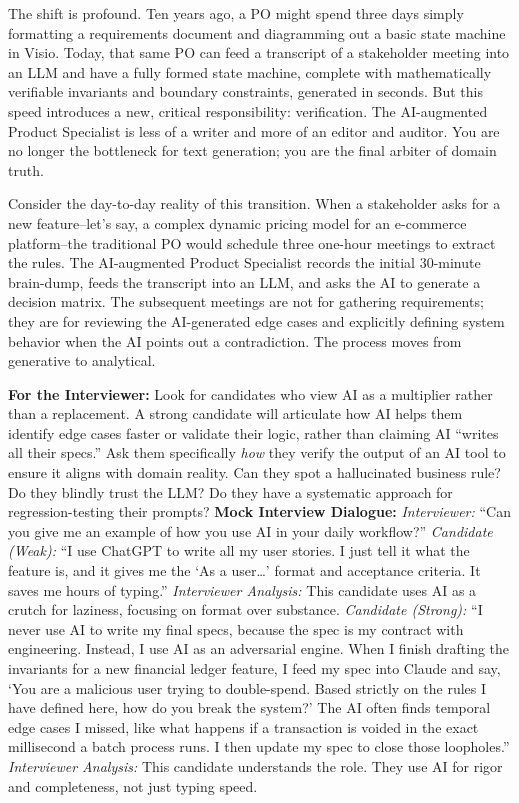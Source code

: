 \documentclass[
  11pt,
  openany,
  oneside]{book}
\renewenvironment{quote}{\begin{customquote}}{\end{customquote}}
\begin{document}
The shift is profound. Ten years ago, a PO might spend three days simply
formatting a requirements document and diagramming out a basic state
machine in Visio. Today, that same PO can feed a transcript of a
stakeholder meeting into an LLM and have a fully formed state machine,
complete with mathematically verifiable invariants and boundary
constraints, generated in seconds. But this speed introduces a new,
critical responsibility: verification. The AI-augmented Product
Specialist is less of a writer and more of an editor and auditor. You
are no longer the bottleneck for text generation; you are the final
arbiter of domain truth.

Consider the day-to-day reality of this transition. When a stakeholder
asks for a new feature--let's say, a complex dynamic pricing model for
an e-commerce platform--the traditional PO would schedule three one-hour
meetings to extract the rules. The AI-augmented Product Specialist
records the initial 30-minute brain-dump, feeds the transcript into an
LLM, and asks the AI to generate a decision matrix. The subsequent
meetings are not for gathering requirements; they are for reviewing the
AI-generated edge cases and explicitly defining system behavior when the
AI points out a contradiction. The process moves from generative to
analytical.

\begin{quote}
\textbf{For the Interviewer:} Look for candidates who view AI as a
multiplier rather than a replacement. A strong candidate will articulate
how AI helps them identify edge cases faster or validate their logic,
rather than claiming AI ``writes all their specs.'' Ask them
specifically \emph{how} they verify the output of an AI tool to ensure
it aligns with domain reality. Can they spot a hallucinated business
rule? Do they blindly trust the LLM? Do they have a systematic approach
for regression-testing their prompts? \textbf{Mock Interview Dialogue:}
\emph{Interviewer:} ``Can you give me an example of how you use AI in
your daily workflow?'' \emph{Candidate (Weak):} ``I use ChatGPT to write
all my user stories. I just tell it what the feature is, and it gives me
the `As a user\ldots{}' format and acceptance criteria. It saves me
hours of typing.'' \emph{Interviewer Analysis:} This candidate uses AI
as a crutch for laziness, focusing on format over substance.
\emph{Candidate (Strong):} ``I never use AI to write my final specs,
because the spec is my contract with engineering. Instead, I use AI as
an adversarial engine. When I finish drafting the invariants for a new
financial ledger feature, I feed my spec into Claude and say, `You are a
malicious user trying to double-spend. Based strictly on the rules I
have defined here, how do you break the system?' The AI often finds
temporal edge cases I missed, like what happens if a transaction is
voided in the exact millisecond a batch process runs. I then update my
spec to close those loopholes.'' \emph{Interviewer Analysis:} This
candidate understands the role. They use AI for rigor and completeness,
not just typing speed.
\end{quote}
\end{document}
